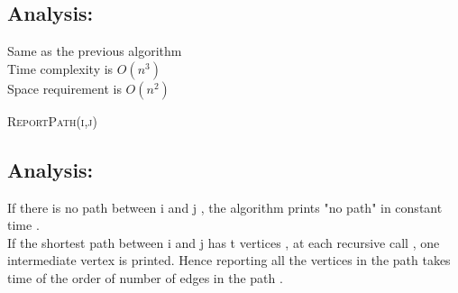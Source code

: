 \documentclass[11pt]{article}
\begin{document}
\subsection*{Analysis: }
Same as the previous algorithm\\
Time complexity is $O(n^3)$ \\
Space requirement is $O(n^2)$ \\

\begin{algorithm}
\caption{\textsc{ReportPath(i,j)}}
\end{algorithm}

\subsection*{Analysis: }
If there is no path between i and j , the algorithm prints "no path" in constant time . \\
If the shortest path between i and j has t vertices , at each recursive call , one intermediate vertex is printed.
Hence reporting all the vertices in the path takes time of the order of number of edges in the path .\\
\end{document}
